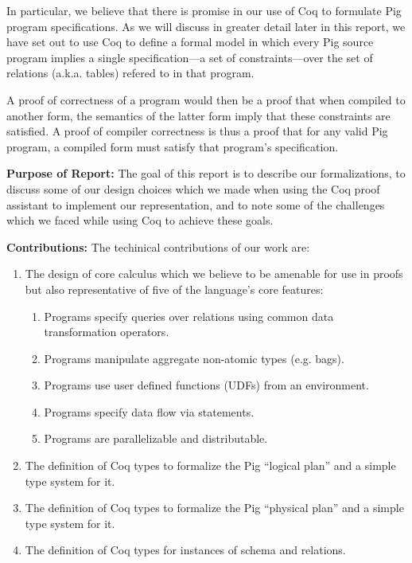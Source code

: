 In particular, we believe that there is promise in our use of Coq to formulate Pig program specifications. As we will discuss in greater detail later in this report, we have set out to use Coq to define a formal model in which every Pig source program implies a single specification---a set of constraints---over the set of relations (a.k.a. tables) refered to in that program.

A proof of correctness of a program would then be a proof that when compiled to another form, the semantics of the latter form imply that these constraints are satisfied. A proof of compiler correctness is thus a proof that for any valid Pig program, a compiled form must satisfy that program's specification.

\textbf{Purpose of Report:} The goal of this report is to describe our formalizations, to discuss some of our design choices which we made when using the Coq proof assistant to implement our representation, and to note some of the challenges which we faced while using Coq to achieve these goals.

\textbf{Contributions:} The techinical contributions of our work are:

\begin{enumerate}
  \item The design of core calculus which we believe to be amenable for use
	      in proofs but also representative of five of the language's core features:
	\begin{enumerate}
		\item Programs specify queries over relations using common data
		      transformation operators.
		\item Programs manipulate aggregate non-atomic types (e.g. bags).
		\item Programs use user defined functions (UDFs) from an environment.
		\item Programs specify data flow via statements.
		\item Programs are parallelizable and distributable.
	\end{enumerate}
  \item The definition of Coq types to formalize the Pig ``logical plan'' and
	      a simple type system for it.
  \item The definition of Coq types to formalize the Pig ``physical plan''
	      and a simple type system for it.
  \item The definition of Coq types for instances of schema and relations.
\end{enumerate}

